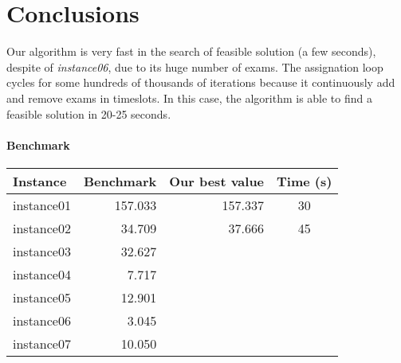 \section*{Conclusions}
Our algorithm is very fast in the search of feasible solution (a few seconds), despite of \emph{instance06}, due to its huge number of exams. The assignation loop cycles for some hundreds of thousands of iterations because it continuously add and remove exams in timeslots. In this case, the algorithm is able to find a feasible solution in 20-25 seconds.

\paragraph*{Benchmark}
\begin{center}
\begin{tabular}{lrrc}
\toprule
Instance	&	Benchmark	&	Our best value	&	Time (s)	\\
\midrule
instance01	&	157.033	&	157.337	&	30	\\
instance02	&	34.709	&	37.666	&	45	\\
instance03	&	32.627	&	&		\\
instance04	&	7.717	&	&		\\
instance05	&	12.901	&	&		\\
instance06	&	3.045	&	&		\\
instance07	&	10.050	&	&		\\
\bottomrule
\end{tabular}
\end{center}